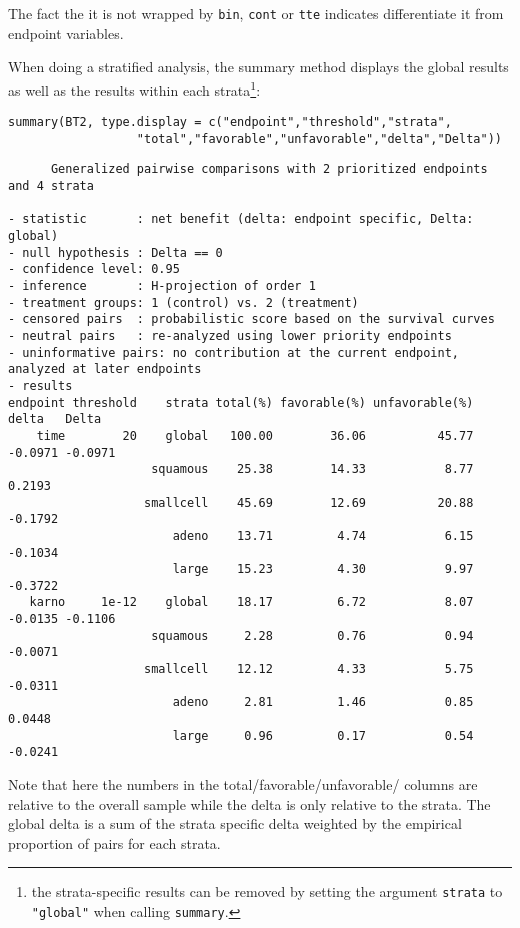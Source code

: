 \documentclass[12pt]{article}
\begin{document}
The fact the it is not wrapped by \texttt{bin}, \texttt{cont} or \texttt{tte} indicates
differentiate it from endpoint variables. 

\bigskip

When doing a stratified analysis, the summary method displays the
global results as well as the results within each strata\footnote{the
strata-specific results can be removed by setting the argument
\texttt{strata} to \texttt{"global"} when calling \texttt{summary}.}:
\lstset{language=r,label= ,caption= ,captionpos=b,numbers=none}
\begin{lstlisting}
summary(BT2, type.display = c("endpoint","threshold","strata",
			      "total","favorable","unfavorable","delta","Delta"))
\end{lstlisting}

\begin{verbatim}
      Generalized pairwise comparisons with 2 prioritized endpoints and 4 strata

- statistic       : net benefit (delta: endpoint specific, Delta: global) 
- null hypothesis : Delta == 0 
- confidence level: 0.95 
- inference       : H-projection of order 1
- treatment groups: 1 (control) vs. 2 (treatment) 
- censored pairs  : probabilistic score based on the survival curves
- neutral pairs   : re-analyzed using lower priority endpoints
- uninformative pairs: no contribution at the current endpoint, analyzed at later endpoints
- results
endpoint threshold    strata total(%) favorable(%) unfavorable(%)   delta   Delta
    time        20    global   100.00        36.06          45.77 -0.0971 -0.0971
                    squamous    25.38        14.33           8.77  0.2193        
                   smallcell    45.69        12.69          20.88 -0.1792        
                       adeno    13.71         4.74           6.15 -0.1034        
                       large    15.23         4.30           9.97 -0.3722        
   karno     1e-12    global    18.17         6.72           8.07 -0.0135 -0.1106
                    squamous     2.28         0.76           0.94 -0.0071        
                   smallcell    12.12         4.33           5.75 -0.0311        
                       adeno     2.81         1.46           0.85  0.0448        
                       large     0.96         0.17           0.54 -0.0241
\end{verbatim}

Note that here the numbers in the total/favorable/unfavorable/ columns
are relative to the overall sample while the delta is only relative to
the strata. The global delta is a sum of the strata specific delta
weighted by the empirical proportion of pairs for each strata.
\end{document}
